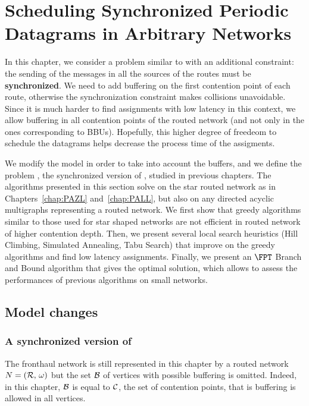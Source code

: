 
\chapter{Scheduling Synchronized Periodic Datagrams in Arbitrary Networks }
\label{chap:SPALL}

\minitoc

In this chapter, we consider a problem similar to \pall with an additional constraint: the sending of the messages in all the sources of the routes must be \textbf{synchronized}. We need to add buffering on the first contention point of each route, otherwise the synchronization constraint makes collisions unavoidable. Since it is much harder to find assignments with low latency in this context, we allow buffering in all contention points of the routed network (and not only in the ones corresponding to BBUs). Hopefully, this higher degree of freedeom to schedule the datagrams helps decrease the process time of the assigments.

We modify the model in order to take into account the buffers, and we define the problem
\minstra, the synchronized version of \mintra, studied in previous chapters. The algorithms presented in this section solve \minstra on the star routed network as in Chapters~\ref{chap:PAZL} and~\ref{chap:PALL}, but also on any directed acyclic multigraphs representing a routed network. We first show that greedy algorithms similar to those used for star shaped networks are not efficient in routed network of higher contention depth. Then, we present several local search heuristics (Hill Climbing, Simulated Annealing, Tabu Search) that improve on the greedy algorithms and find low latency assignments. Finally, we present an $\FPT$ Branch and Bound algorithm that gives the optimal solution, which allows to assess the performances of previous algorithms on small networks.


\section{Model changes}
\subsection{A synchronized version of \minstra}

The fronthaul network is still represented in this chapter by a routed network $N = ({\cal R},\,\omega)$ but the set ${\cal B}$ of vertices with possible buffering is omitted. Indeed, in this chapter, ${\cal B}$ is equal to ${\cal C}$, the set of contention points, that is buffering is allowed in all vertices. 

